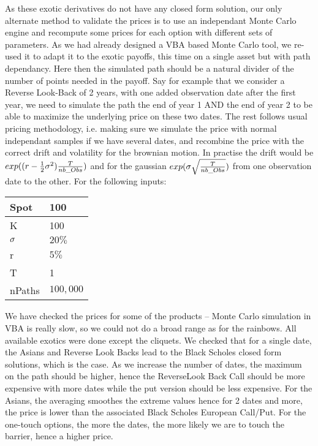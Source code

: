 As these exotic derivatives do not have any closed form solution, our only alternate method to validate the prices is to use an independant Monte Carlo engine and recompute some prices for each option with different sets of parameters. As we had already designed a VBA based Monte Carlo tool, we re-used it to adapt it to the exotic payoffs, this time on a single asset but with path dependancy. Here then the simulated path should be a natural divider of the number of points needed in the payoff. Say for example that we consider a Reverse Look-Back of 2 years, with one added observation date after the first year, we need to simulate the path the end of year 1 AND the end of year 2 to be able to maximize the underlying price on these two dates. The rest follows usual pricing methodology, i.e. making sure we simulate the price with normal independant samples if we have several dates, and recombine the price with the correct drift and volatility for the brownian motion. In practise the drift would be $exp((r-\frac{1}{2}\sigma^2)\frac{T}{nb\_Obs})$ and for the gaussian $exp(\sigma\sqrt{\frac{T}{nb\_Obs}})$ from one observation date to the other. For the following inputs:

\begin{center}
\begin{tabular}{|l|l|}
\hline
Spot & 100 \\ 
\hline
K & 100 \\ 
\hline
$\sigma$ & $20\%$ \\ 
\hline
r & $5\%$ \\ 
\hline
T & 1 \\ 
\hline
nPaths &  $100,000$  \\ 
\hline
\end{tabular}
\end{center}

We have checked the prices for some of the products -- Monte Carlo simulation in VBA is really slow, so we could not do a broad range as for the rainbows. All available exotics were done except the cliquets. We checked that for a single date, the Asians and Reverse Look Backs lead to the Black Scholes closed form solutions, which is the case. As we increase the number of dates, the maximum on the path should be higher, hence the ReverseLook Back Call should be more expensive with more dates while the put version should be less expensive. For the Asians, the averaging smoothes the extreme values hence for 2 dates and more, the price is lower than the associated Black Scholes European Call/Put. For the one-touch options, the more the dates, the more likely we are to touch the barrier, hence a higher price.

